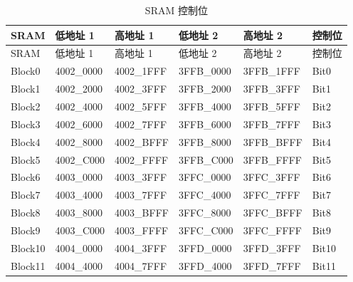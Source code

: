 \documentclass[main\_\_CN.tex]{subfiles}
\begin{document}
\begin{longtable}{|l|l|l|l|l|l|}
\caption{SRAM 控制位} \label{table:sramcontrollingbit} \\
\hline
\rowcolor{lightgray}
SRAM & 低地址 1 & 高地址 1 & 低地址 2 & 高地址 2 & 控制位 \\
\hline
\endfirsthead

\hline
\rowcolor{lightgray}
SRAM & 低地址 1 & 高地址 1 & 低地址 2 & 高地址 2 & 控制位 \\
\hline
\endhead

\hline
\endfoot

\hline
\endlastfoot

Block0  & \hexprefix{}4002\_0000 & \hexprefix{}4002\_1FFF & \hexprefix{}3FFB\_0000 & \hexprefix{}3FFB\_1FFF & Bit0 \\
\hline
Block1  & \hexprefix{}4002\_2000 & \hexprefix{}4002\_3FFF & \hexprefix{}3FFB\_2000 & \hexprefix{}3FFB\_3FFF & Bit1 \\
\hline
Block2  & \hexprefix{}4002\_4000 & \hexprefix{}4002\_5FFF & \hexprefix{}3FFB\_4000 & \hexprefix{}3FFB\_5FFF & Bit2 \\
\hline
Block3  & \hexprefix{}4002\_6000 & \hexprefix{}4002\_7FFF & \hexprefix{}3FFB\_6000 & \hexprefix{}3FFB\_7FFF & Bit3 \\
\hline
Block4  & \hexprefix{}4002\_8000 & \hexprefix{}4002\_BFFF & \hexprefix{}3FFB\_8000 & \hexprefix{}3FFB\_BFFF & Bit4 \\
\hline
Block5  & \hexprefix{}4002\_C000 & \hexprefix{}4002\_FFFF & \hexprefix{}3FFB\_C000 & \hexprefix{}3FFB\_FFFF & Bit5 \\
\hline
Block6  & \hexprefix{}4003\_0000 & \hexprefix{}4003\_3FFF & \hexprefix{}3FFC\_0000 & \hexprefix{}3FFC\_3FFF & Bit6 \\
\hline
Block7  & \hexprefix{}4003\_4000 & \hexprefix{}4003\_7FFF & \hexprefix{}3FFC\_4000 & \hexprefix{}3FFC\_7FFF & Bit7 \\
\hline
Block8  & \hexprefix{}4003\_8000 & \hexprefix{}4003\_BFFF & \hexprefix{}3FFC\_8000 & \hexprefix{}3FFC\_BFFF & Bit8 \\
\hline
Block9  & \hexprefix{}4003\_C000 & \hexprefix{}4003\_FFFF & \hexprefix{}3FFC\_C000 & \hexprefix{}3FFC\_FFFF & Bit9 \\
\hline
Block10 & \hexprefix{}4004\_0000 & \hexprefix{}4004\_3FFF & \hexprefix{}3FFD\_0000 & \hexprefix{}3FFD\_3FFF & Bit10 \\
\hline
Block11 & \hexprefix{}4004\_4000 & \hexprefix{}4004\_7FFF & \hexprefix{}3FFD\_4000 & \hexprefix{}3FFD\_7FFF & Bit11 \\

\end{longtable}
\end{document}
